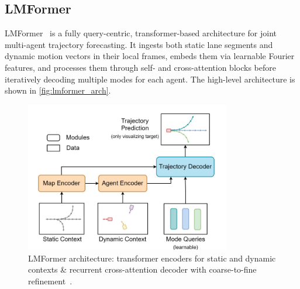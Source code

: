 \subsection{LMFormer}
\label{ssec:lmformer}

LMFormer~\cite{lmformerYadav2025} is a fully query-centric, transformer-based architecture for joint multi-agent trajectory forecasting. It ingests both static lane segments and dynamic motion vectors in their local frames, embeds them via learnable Fourier features, and processes them through self- and cross-attention blocks before iteratively decoding multiple modes for each agent. The high-level architecture is shown in \autoref{fig:lmformer_arch}.

\begin{figure}[ht]
  \centering
  \includegraphics[width=0.8\textwidth]{figures/lmformer_arch.png}
  \caption{LMFormer architecture: transformer encoders for static and dynamic contexts \& recurrent cross-attention decoder with coarse-to-fine refinement~\cite{lmformerYadav2025}.}
  \label{fig:lmformer_arch}
\end{figure}


